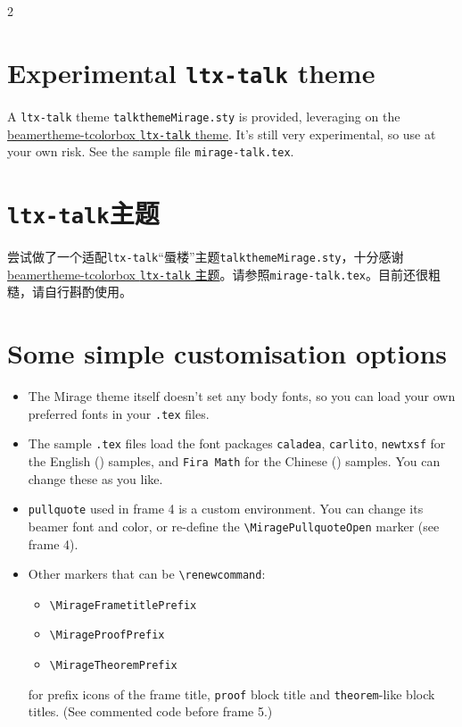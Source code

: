 \documentclass{article}
\begin{document}
\begin{paracol}{2}
\switchcolumn*

\section{Experimental \texttt{ltx-talk} theme}

A \texttt{ltx-talk} theme \texttt{talkthemeMirage.sty} is provided, leveraging on the \href{https://ctan.org/pkg/beamertheme-tcolorbox}{beamertheme-tcolorbox \texttt{ltx-talk} theme}. It's still very experimental, so use at your own risk. See the sample file \texttt{mirage-talk.tex}. 

\switchcolumn

\section{\texttt{ltx-talk}主题}

尝试做了一个适配\texttt{ltx-talk}“蜃楼”主题\texttt{talkthemeMirage.sty}，十分感谢\href{https://ctan.org/pkg/beamertheme-tcolorbox}{beamertheme-tcolorbox \texttt{ltx-talk} 主题}。请参照\texttt{mirage-talk.tex}。目前还很粗糙，请自行斟酌使用。

\switchcolumn*

\section{Some simple customisation options}

\begin{itemize}
\item The Mirage theme itself doesn't set any body fonts, so you can load your own preferred fonts in your \texttt{.tex} files.

\item  The sample \texttt{.tex} files load the font packages \texttt{caladea}, \texttt{carlito}, \texttt{newtxsf} for the English () samples, and \texttt{Fira Math} for the Chinese () samples. You can change these as you like.

\item \texttt{pullquote} used in frame 4 is a custom environment. You can change its beamer font and color, or re-define the \verb|\MiragePullquoteOpen| marker (see frame 4).

\item  Other markers that can be \verb|\renewcommand|:
\begin{itemize}[nosep]
  \item \verb|\MirageFrametitlePrefix|
  \item \verb|\MirageProofPrefix| 
  \item \verb|\MirageTheoremPrefix|
\end{itemize} 
for prefix icons of the frame title, \texttt{proof} block title and \texttt{theorem}-like block titles. (See commented code before frame 5.)


\end{itemize}
\end{paracol}
\end{document}
